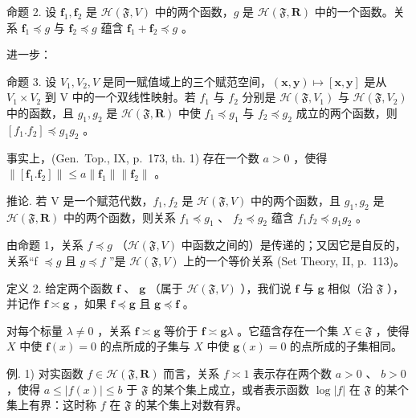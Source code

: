命题 2. 设 \(\mathbf{f}_1, \mathbf{f}_2\) 是 \(\mathcal{H}(\mathfrak{F}, V)\) 中的两个函数，\(g\) 是 \(\mathcal{H}(\mathfrak{F}, \mathbf{R})\) 中的一个函数。关系 \(\mathbf{f}_1 \preccurlyeq g\) 与 \(\mathbf{f}_2 \preccurlyeq g\) 蕴含 \(\mathbf{f}_1 + \mathbf{f}_2 \preccurlyeq g\) 。

进一步：

命题 3. 设 \(V_{1}, V_{2}, V\) 是同一赋值域上的三个赋范空间，\((\mathbf{x}, \mathbf{y}) \mapsto [\mathbf{x}, \mathbf{y}]\) 是从 \(V_{1} \times V_{2}\) 到 V 中的一个双线性映射。若 \(f_{1}\) 与 \(f_{2}\) 分别是 \(\mathcal{H}(\mathfrak{F}, V_{1})\) 与 \(\mathcal{H}(\mathfrak{F}, V_{2})\) 中的函数，且 \(g_{1}, g_{2}\) 是 \(\mathcal{H}(\mathfrak{F}, \mathbf{R})\) 中使 \(f_{1} \preccurlyeq g_{1}\) 与 \(f_{2} \preccurlyeq g_{2}\) 成立的两个函数，则 \([f_{1}.f_{2}] \preccurlyeq g_{1}g_{2}\) 。

事实上，(Gen.~Top., IX, p.~173, th. 1) 存在一个数 \(a > 0\) ，使得 \(\|[\mathbf{f}_1.\mathbf{f}_2]\| \leqslant a\|\mathbf{f}_1\|\|\mathbf{f}_2\|\) 。

推论. 若 V 是一个赋范代数，\(f_{1}, f_{2}\) 是 \(\mathcal{H}(\mathfrak{F}, V)\) 中的两个函数，且 \(g_{1}, g_{2}\) 是 \(\mathcal{H}(\mathfrak{F}, \mathbf{R})\) 中的两个函数，则关系 \(f_{1} \preccurlyeq g_{1}\) 、 \(f_{2} \preccurlyeq g_{2}\) 蕴含 \(f_{1}f_{2} \preccurlyeq g_{1}g_{2}\) 。

由命题 1，关系 \(f \preccurlyeq g\) （\(\mathcal{H}(\mathfrak{F}, V)\) 中函数之间的）是传递的；又因它是自反的，关系“f \(\preccurlyeq g\) 且 \(g \preccurlyeq f\) ”是 \(\mathcal{H}(\mathfrak{F}, V)\) 上的一个等价关系 (Set Theory, II, p.~113)。

定义 2. 给定两个函数 \(\mathbf{f}\) 、 \(\mathbf{g}\) （属于 \(\mathcal{H}(\mathfrak{F}, V)\) ），我们说 \(\mathbf{f}\) 与 \(\mathbf{g}\) 相似（沿 \(\mathfrak{F}\) ），并记作 \(\mathbf{f} \asymp \mathbf{g}\) ，如果 \(\mathbf{f} \preccurlyeq \mathbf{g}\) 且 \(\mathbf{g} \preccurlyeq \mathbf{f}\) 。

对每个标量 \(\lambda \neq 0\) ，关系 \(\mathbf{f} \asymp \mathbf{g}\) 等价于 \(\mathbf{f} \asymp \mathbf{g}\lambda\) 。它蕴含存在一个集 \(X \in \mathfrak{F}\) ，使得 \(X\) 中使 \(\mathbf{f}(x) = 0\) 的点所成的子集与 \(X\) 中使 \(\mathbf{g}(x) = 0\) 的点所成的子集相同。

例. 1) 对实函数 \(f \in \mathcal{H}(\mathfrak{F}, \mathbf{R})\) 而言，关系 \(f \asymp 1\) 表示存在两个数 \(a > 0\) 、 \(b > 0\) ，使得 \(a \leqslant |f(x)| \leqslant b\) 于 \(\mathfrak{F}\) 的某个集上成立，或者表示函数 \(\log |f|\) 在 \(\mathfrak{F}\) 的某个集上有界：这时称 \(f\) 在 \(\mathfrak{F}\) 的某个集上对数有界。

